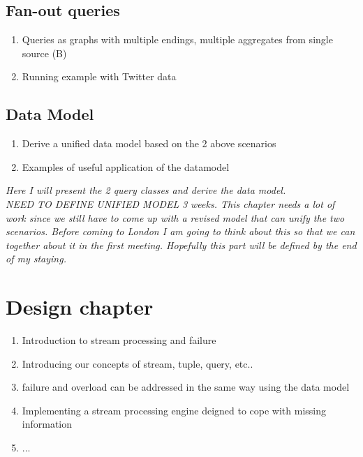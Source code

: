 \subsection{Fan-out queries}
\begin{enumerate}
	\item Queries as graphs with multiple endings, multiple aggregates from single source (B)
	\item Running example with Twitter data
\end{enumerate}

\subsection{Data Model}	
\begin{enumerate}
	\item Derive a unified data model based on the 2 above scenarios
	\item Examples of useful application of the datamodel
\end{enumerate}

\emph{Here I will present the 2 query classes and derive the data model.\\NEED TO DEFINE UNIFIED MODEL}
\emph{3 weeks. This chapter needs a lot of work since we still have to come up with a revised model that can unify the two scenarios. Before coming to London I am going to think about this so that we can together about it in the first meeting. Hopefully this part will be defined by the end of my staying.}

\section{Design chapter}
\begin{enumerate}
	\item Introduction to stream processing and failure
	\item Introducing our concepts of stream, tuple, query, etc..
	\item failure and overload can be addressed in the same way using the data model
	\item Implementing a stream processing engine deigned to cope with missing information
	\item ...
\end{enumerate}



